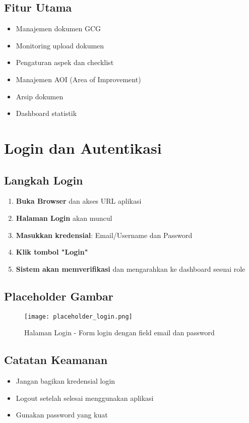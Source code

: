 \documentclass[12pt,a4paper]{article}
\begin{document}
\subsection{Fitur Utama}
\begin{itemize}
\item Manajemen dokumen GCG
\item Monitoring upload dokumen
\item Pengaturan aspek dan checklist
\item Manajemen AOI (Area of Improvement)
\item Arsip dokumen
\item Dashboard statistik
\end{itemize}

\section{Login dan Autentikasi}
\subsection{Langkah Login}
\begin{enumerate}
\item \textbf{Buka Browser} dan akses URL aplikasi
\item \textbf{Halaman Login} akan muncul
\item \textbf{Masukkan kredensial}: Email/Username dan Password
\item \textbf{Klik tombol "Login"}
\item \textbf{Sistem akan memverifikasi} dan mengarahkan ke dashboard sesuai role
\end{enumerate}

\subsection{Placeholder Gambar}
\begin{figure}[H]
\centering
\texttt{[image: placeholder\_login.png]}
\caption{Halaman Login - Form login dengan field email dan password}
\label{fig:login}
\end{figure}

\subsection{Catatan Keamanan}
\begin{itemize}
\item Jangan bagikan kredensial login
\item Logout setelah selesai menggunakan aplikasi
\item Gunakan password yang kuat
\end{itemize}
\end{document}
